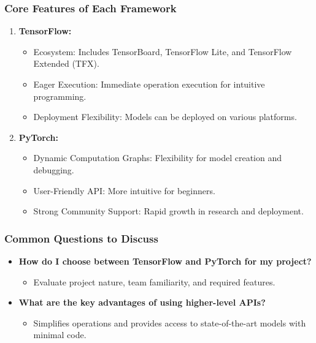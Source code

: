 \documentclass[aspectratio=169]{beamer}
\begin{document}
\begin{frame}
    \frametitle{Core Features of Each Framework}
    \begin{enumerate}
        \item \textbf{TensorFlow:}
            \begin{itemize}
                \item Ecosystem: Includes TensorBoard, TensorFlow Lite, and TensorFlow Extended (TFX).
                \item Eager Execution: Immediate operation execution for intuitive programming.
                \item Deployment Flexibility: Models can be deployed on various platforms.
            \end{itemize}
        \item \textbf{PyTorch:}
            \begin{itemize}
                \item Dynamic Computation Graphs: Flexibility for model creation and debugging.
                \item User-Friendly API: More intuitive for beginners.
                \item Strong Community Support: Rapid growth in research and deployment.
            \end{itemize}
    \end{enumerate}
\end{frame}

\begin{frame}
    \frametitle{Common Questions to Discuss}
    \begin{itemize}
        \item \textbf{How do I choose between TensorFlow and PyTorch for my project?}
            \begin{itemize}
                \item Evaluate project nature, team familiarity, and required features.
            \end{itemize}
        \item \textbf{What are the key advantages of using higher-level APIs?}
            \begin{itemize}
                \item Simplifies operations and provides access to state-of-the-art models with minimal code.
            \end{itemize}
    \end{itemize}
\end{frame}
\end{document}
